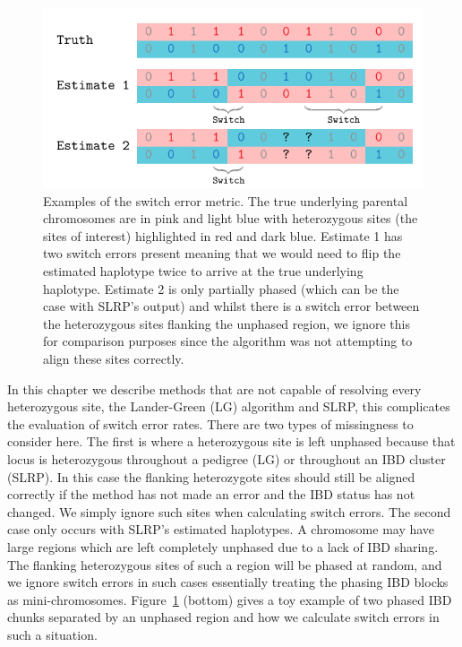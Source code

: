 \begin{figure}[h]
  \begin{center} 
    \includegraphics[width=\textwidth]{chap3figs/switcherror}
    \caption[Examples of the switch error metric]{Examples of the switch error metric.  The true underlying parental chromosomes are in pink and light blue with heterozygous sites (the sites of interest) highlighted in red and dark blue.   Estimate 1 has two switch errors present meaning that we would need to flip the estimated haplotype twice to arrive at the true underlying haplotype.  Estimate 2 is only partially phased (which can be the case with SLRP's output) and whilst there is a switch error between the heterozygous sites flanking the unphased region, we ignore this for comparison purposes since the algorithm was not attempting to align these sites correctly. \label{chap3:switcherror}}
  \end{center} 
\end{figure}
\clearpage
In this chapter we describe methods that are not capable of resolving every heterozygous site, the Lander-Green (LG) algorithm and SLRP, this complicates the evaluation of switch error rates. There are two types of missingness to consider here.  The first is where a heterozygous site is left unphased because that locus is heterozygous throughout a pedigree (LG) or throughout an IBD cluster (SLRP).  In this case the flanking heterozygote sites should still be aligned correctly if the method has not made an error and the IBD status has not changed.  We simply ignore such sites when calculating switch errors. The second case only occurs with SLRP's estimated haplotypes.  A chromosome may have large regions which are left completely unphased due to a lack of IBD sharing.  The flanking heterozygous sites of such a region will be phased at random, and we ignore switch errors in such cases essentially treating the phasing IBD blocks as mini-chromosomes. Figure~\ref{chap3:switcherror} (bottom) gives a toy example of two phased IBD chunks separated by an unphased region and how we calculate switch errors in such a situation.


